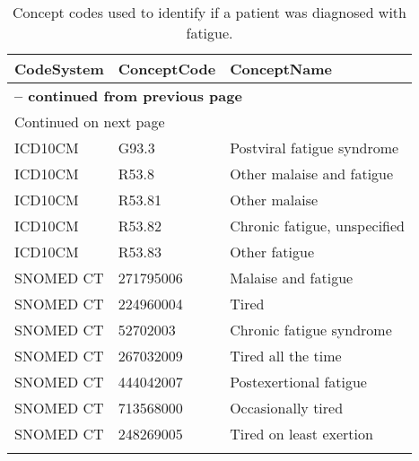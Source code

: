 \begin{longtable}{p{}p{}p{}}
\caption{Concept codes used to identify if a patient was diagnosed with fatigue.} \\ 
 CodeSystem & ConceptCode & ConceptName \\ 
  \hline 
\endfirsthead 
\multicolumn{3}{p{\textwidth}}{{ \bfseries \tablename \thetable{} -- continued from previous page}} \ 
\hline CodeSystem & ConceptCode & ConceptName \\ \hline 
\endhead 
\hline \multicolumn{3}{p{\textwidth}}{{Continued on next page}} \\ \hline 
\endfoot 
\hline 
\endlastfoot 
 \hline
ICD10CM & G93.3 & Postviral fatigue syndrome \\ 
  ICD10CM & R53.8 & Other malaise and fatigue \\ 
  ICD10CM & R53.81 & Other malaise \\ 
  ICD10CM & R53.82 & Chronic fatigue, unspecified \\ 
  ICD10CM & R53.83 & Other fatigue \\ 
  SNOMED CT & 271795006 & Malaise and fatigue \\ 
  SNOMED CT & 224960004 & Tired \\ 
  SNOMED CT & 52702003 & Chronic fatigue syndrome \\ 
  SNOMED CT & 267032009 & Tired all the time \\ 
  SNOMED CT & 444042007 & Postexertional fatigue \\ 
  SNOMED CT & 713568000 & Occasionally tired \\ 
  SNOMED CT & 248269005 & Tired on least exertion \\ 
  \hline
\label{tab:codes_fatigue}
\end{longtable}
